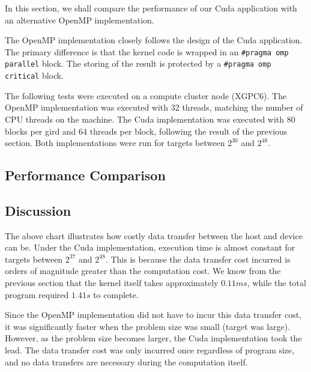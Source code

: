 \documentclass[a4paper,12pt]{article}
\begin{document}
In this section, we shall compare the performance of our Cuda application with an alternative OpenMP implementation.

The OpenMP implementation closely follows the design of the Cuda application. The primary difference is that the kernel code is wrapped in an \texttt{#pragma omp parallel} block. The storing of the result is protected by a \texttt{#pragma omp critical} block.

The following tests were executed on a compute cluster node (XGPC6). The OpenMP implementation was executed with 32 threads, matching the number of CPU threads on the machine. The Cuda implementation was executed with 80 blocks per gird and 64 threads per block, following the result of the previous section. Both implementations were run for targets between $2^{30}$ and $2^{48}$.

\subsection{Performance Comparison}

\subsection{Discussion}

The above chart illustrates how costly data transfer between the host and device can be. Under the Cuda implementation, execution time is almost constant for targets between $2^{37}$ and $2^{48}$. This is because the data transfer cost incurred is orders of magnitude greater than the computation cost. We know from the previous section that the kernel itself takes approximately $0.11 ms$, while the total program required $1.41 s$ to complete.

Since the OpenMP implementation did not have to incur this data transfer cost, it was significantly faster when the problem size was small (target was large). However, as the problem size becomes larger, the Cuda implementation took the lead. The data transfer cost was only incurred once regardless of program size, and no data transfers are necessary during the computation itself.

\newpage
\end{document}
